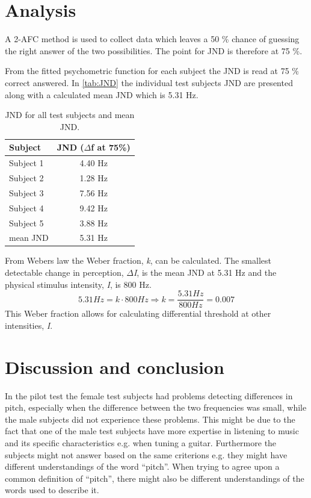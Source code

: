 \section*{Analysis}
%
A 2-AFC method is used to collect data which leaves a 50 \% chance of guessing the right answer of the two possibilities. The point for JND is therefore at 75 \%.

From the fitted psychometric function for each subject the JND is read at 75 \% correct answered. In \autoref{tab:JND} the individual test subjects JND are presented along with a calculated mean JND which is 5.31 Hz. 
%
\begin{table}[H]
\centering
\begin{tabular}{l|c}
Subject     & JND ($\Delta$f at 75\%) \\\hline
Subject 1   & 4.40 Hz                 \\\hline
Subject 2   & 1.28 Hz                 \\\hline
Subject 3   & 7.56 Hz                 \\\hline
Subject 4   & 9.42 Hz                 \\\hline
Subject 5   & 3.88 Hz                 \\\hline
mean JND & 5.31 Hz       
\end{tabular}
\caption{JND for all test subjects and mean JND.}
\label{tab:JND}         
\end{table}
\noindent
%
From Webers law the Weber fraction, \textit{k}, can be calculated. The smallest detectable change in perception, \textit{$\Delta$I}, is the mean JND at 5.31 Hz and the physical stimulus intensity, \textit{I}, is 800 Hz.
% 
\begin{equation}
5.31 Hz = k \cdot 800 Hz \Rightarrow k = \frac{5.31 Hz}{800 Hz} = 0.007
\end{equation}
%
This Weber fraction allows for calculating differential threshold at other intensities, \textit{I}. 
%

\section*{Discussion and conclusion}
%
In the pilot test the female test subjects had problems detecting differences in pitch, especially when the difference between the two frequencies was small, while the male subjects did not experience these problems. This might be due to the fact that one of the male test subjects have more expertise in listening to music and its specific characteristics e.g. when tuning a guitar. Furthermore the subjects might not answer based on the same criterions e.g. they might have different understandings of the word “pitch”. When trying to agree upon a common definition of “pitch”, there might also be different understandings of the words used to describe it.  

